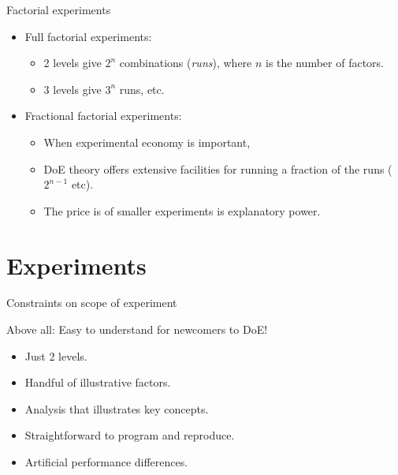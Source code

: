 \documentclass[english,usenames,dvipsnames,aspectratio=169]{beamer}
\begin{document}

\begin{frame}{Factorial experiments}

  \begin{itemize}
  \item Full factorial experiments:
    \begin{itemize}
    \item 2 levels give $2^n$ combinations (\emph{runs}), where $n$ is
      the number of factors.
    \item 3 levels give $3^n$ runs, etc.
    \end{itemize}
  \item Fractional factorial experiments:

    \begin{itemize}
    \item When experimental economy is important,
    \item DoE theory offers extensive facilities for running a
      fraction of the runs ($2^{n-1}$ etc).
    \item The price is of smaller experiments is explanatory power.
    \end{itemize}
  \end{itemize}
\end{frame}



\section{Experiments}

\begin{frame}{Constraints on scope of experiment}

Above all: Easy to understand for newcomers to DoE!

\begin{itemize}
\item Just 2 levels.
\item Handful of illustrative factors.
\item Analysis that illustrates key concepts.
\item Straightforward to program and reproduce.
\item Artificial performance differences.
\end{itemize}

\end{frame}
\end{document}
